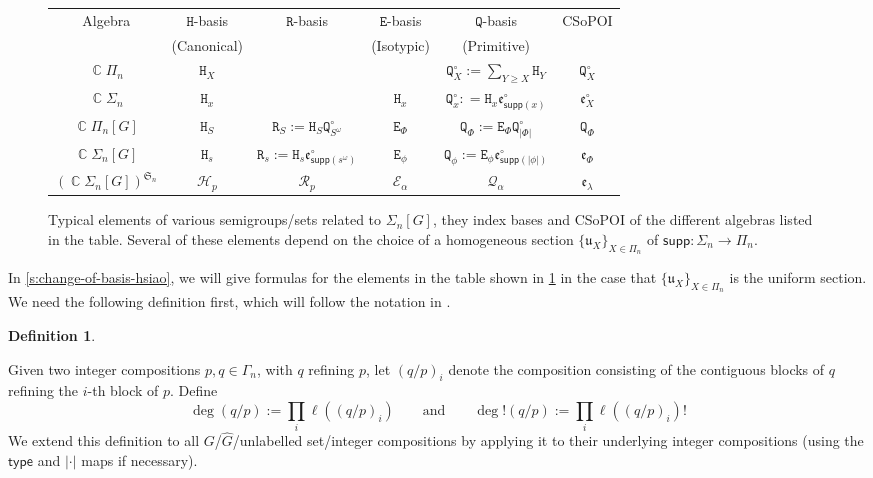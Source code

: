 \documentclass[11pt, oneside, reqno]{amsart}
\theoremstyle{definition}
\newtheorem{definition}[theorem]{Definition}
\numberwithin{equation}{section}
\DeclareMathOperator{\C}{\mathbb{C}}
\def \kk{\C}
\def \sym{\mathfrak{S}}
\def \uu{{\mathfrak{u}}}
\def \ee{{\mathfrak{e}}}
\def \wh{\widehat}
\def \gsetcomposition{{\Sigma_n[G]}}
\def \hsiao {{\gsetcomposition}}
\def \supp{\mathsf{supp}}
\def \type{\mathsf{type}}
\newcommand{\B}[1]{\mathtt{#1}} 			%
\newcommand{\SB}[1]{\mathcal{#1}} 		%
\newcommand{\abs}[1]{|{#1}|} 				%
\begin{document}
\begin{figure}[!ht]
\begin{centering}
    \begin{tabular}{cccccc}
        \toprule
        Algebra                  & $\B{H}$-basis  & $\B{R}$-basis & $\B{E}$-basis & $\B{Q}$-basis & CSoPOI \\ [-0.5ex]
                                 & \footnotesize (Canonical) & & \footnotesize (Isotypic)               & \footnotesize (Primitive)              & \\ \midrule
        $\kk \Pi_n$              & $\B{H}_X$       &                                                  &                 & $\B{Q}^\circ_X := \sum_{Y \geq X} \B{H}_Y$                      & $\B{Q}^\circ_X$     \\
        $\kk \Sigma_n$           & $\B{H}_x$       &                                                  & $\B{H}_x$       & $\B{Q}^\circ_x : = \B{H}_x \ee^\circ_{\supp(x)}$          & $\ee^\circ_X$ \\
        $\kk \Pi_n[G]$           & $\B{H}_S$       & $\B{R}_S := \B{H}_S \B{Q}^\circ_{S^\omega}$            & $\B{E}_\Phi$    & $\B{Q}_\Phi := \B{E}_\Phi \B{Q}^\circ_{\abs{\Phi}}$             & $\B{Q}_\Phi$  \\
        $\kk\hsiao$              & $\B{H}_s$       & $\B{R}_s := \B{H}_s \ee^\circ_{\supp(s^\omega)}$ & $\B{E}_\phi$    & $\B{Q}_\phi := \B{E}_\phi \ee^\circ_{\supp(\abs{\phi})}$  & $\ee_\Phi$    \\
        $(\kk\hsiao)^{\sym_n}$   & $\SB{H}_p$      & $\SB{R}_p$                                       & $\SB{E}_\alpha$ & $\SB{Q}_\alpha$                                           & $\ee_\lambda$ \\ \bottomrule
    \end{tabular} 
\end{centering}
\caption{
        Typical elements of various semigroups/sets related to $\hsiao$, they index bases and CSoPOI of the different algebras listed in the table.
        Several of these elements depend on the choice of a homogeneous section $\{\uu_X\}_{X \in \Pi_n}$ of $\supp : \Sigma_n \to \Pi_n$.}
\label{fig:notationHsiao}
\end{figure}

In \cref{s:change-of-basis-hsiao}, we will give formulas for the elements in the table shown in \cref{fig:notationHsiao} in the case that $\{\uu_X\}_{X \in \Pi_n}$ is the uniform section.
We need the following definition first, which will  follow the notation in \cite{am17}.

\begin{definition}\label{def:deg}
   
    Given two integer compositions $p,q \in \Gamma_n$, with $q$ refining $p$, let $(q/p)_i$ denote the composition consisting of the contiguous blocks of $q$ refining the $i$-th block of $p$.
    Define  
    \[
        \deg(q/p) := \prod_i \ell( (q/p)_i) \qquad\text{and}\qquad \deg!(q/p) := \prod_i \ell( (q/p)_i)!
    \]
    We extend this definition to all $G$/$\wh{G}$/unlabelled set/integer compositions by applying it to their underlying integer compositions (using the $\type$ and $\abs{\cdot}$ maps if necessary).
\end{definition}
\end{document}
